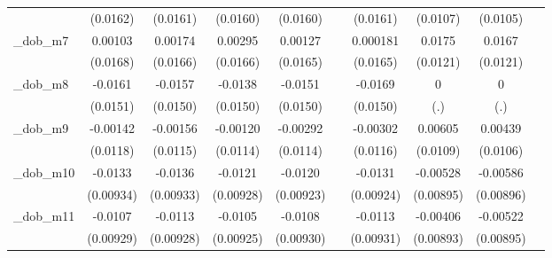 \begin{table}[htbp]
\begin{tabular}{l*{9}{c}}
            &    (0.0162)         &    (0.0161)         &    (0.0160)         &    (0.0160)         &                     &    (0.0161)         &    (0.0107)         &    (0.0105)         &                     \\
[1em]
\_dob\_m7     &     0.00103         &     0.00174         &     0.00295         &     0.00127         &                     &    0.000181         &      0.0175         &      0.0167         &                     \\
            &    (0.0168)         &    (0.0166)         &    (0.0166)         &    (0.0165)         &                     &    (0.0165)         &    (0.0121)         &    (0.0121)         &                     \\
[1em]
\_dob\_m8     &     -0.0161         &     -0.0157         &     -0.0138         &     -0.0151         &                     &     -0.0169         &           0         &           0         &                     \\
            &    (0.0151)         &    (0.0150)         &    (0.0150)         &    (0.0150)         &                     &    (0.0150)         &         (.)         &         (.)         &                     \\
[1em]
\_dob\_m9     &    -0.00142         &    -0.00156         &    -0.00120         &    -0.00292         &                     &    -0.00302         &     0.00605         &     0.00439         &                     \\
            &    (0.0118)         &    (0.0115)         &    (0.0114)         &    (0.0114)         &                     &    (0.0116)         &    (0.0109)         &    (0.0106)         &                     \\
[1em]
\_dob\_m10    &     -0.0133         &     -0.0136         &     -0.0121         &     -0.0120         &                     &     -0.0131         &    -0.00528         &    -0.00586         &                     \\
            &   (0.00934)         &   (0.00933)         &   (0.00928)         &   (0.00923)         &                     &   (0.00924)         &   (0.00895)         &   (0.00896)         &                     \\
[1em]
\_dob\_m11    &     -0.0107         &     -0.0113         &     -0.0105         &     -0.0108         &                     &     -0.0113         &    -0.00406         &    -0.00522         &                     \\
            &   (0.00929)         &   (0.00928)         &   (0.00925)         &   (0.00930)         &                     &   (0.00931)         &   (0.00893)         &   (0.00895)         &                     \\

\end{tabular}
\end{table}

